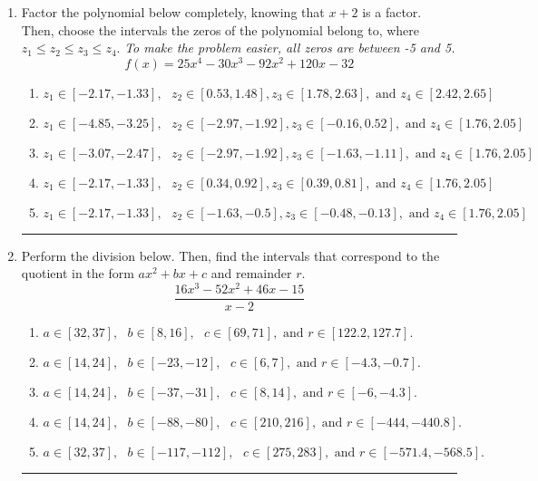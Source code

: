 \documentclass[14pt]{extbook}
\newcommand{\litem}[1]{\item#1\hspace*{-1cm}\rule{\textwidth}{0.4pt}}
\begin{document}
\begin{enumerate}
{\begin{enumerate}[label=\Alph*.]
\end{enumerate} }
\litem{
Factor the polynomial below completely, knowing that $x + 2$ is a factor. Then, choose the intervals the zeros of the polynomial belong to, where $z_1 \leq z_2 \leq z_3 \leq z_4$. \textit{To make the problem easier, all zeros are between -5 and 5.}\[ f(x) = 25x^{4} -30 x^{3} -92 x^{2} +120 x -32 \]\begin{enumerate}[label=\Alph*.]
\item \( z_1 \in [-2.17, -1.33], \text{   }  z_2 \in [0.53, 1.48], z_3 \in [1.78, 2.63], \text{   and   } z_4 \in [2.42, 2.65] \)
\item \( z_1 \in [-4.85, -3.25], \text{   }  z_2 \in [-2.97, -1.92], z_3 \in [-0.16, 0.52], \text{   and   } z_4 \in [1.76, 2.05] \)
\item \( z_1 \in [-3.07, -2.47], \text{   }  z_2 \in [-2.97, -1.92], z_3 \in [-1.63, -1.11], \text{   and   } z_4 \in [1.76, 2.05] \)
\item \( z_1 \in [-2.17, -1.33], \text{   }  z_2 \in [0.34, 0.92], z_3 \in [0.39, 0.81], \text{   and   } z_4 \in [1.76, 2.05] \)
\item \( z_1 \in [-2.17, -1.33], \text{   }  z_2 \in [-1.63, -0.5], z_3 \in [-0.48, -0.13], \text{   and   } z_4 \in [1.76, 2.05] \)

\end{enumerate} }
\litem{
Perform the division below. Then, find the intervals that correspond to the quotient in the form $ax^2+bx+c$ and remainder $r$.\[ \frac{16x^{3} -52 x^{2} +46 x -15}{x -2} \]\begin{enumerate}[label=\Alph*.]
\item \( a \in [32, 37], \text{   } b \in [8, 16], \text{   } c \in [69, 71], \text{   and   } r \in [122.2, 127.7]. \)
\item \( a \in [14, 24], \text{   } b \in [-23, -12], \text{   } c \in [6, 7], \text{   and   } r \in [-4.3, -0.7]. \)
\item \( a \in [14, 24], \text{   } b \in [-37, -31], \text{   } c \in [8, 14], \text{   and   } r \in [-6, -4.3]. \)
\item \( a \in [14, 24], \text{   } b \in [-88, -80], \text{   } c \in [210, 216], \text{   and   } r \in [-444, -440.8]. \)
\item \( a \in [32, 37], \text{   } b \in [-117, -112], \text{   } c \in [275, 283], \text{   and   } r \in [-571.4, -568.5]. \)


\end{enumerate}}
\end{enumerate}
\end{document}
